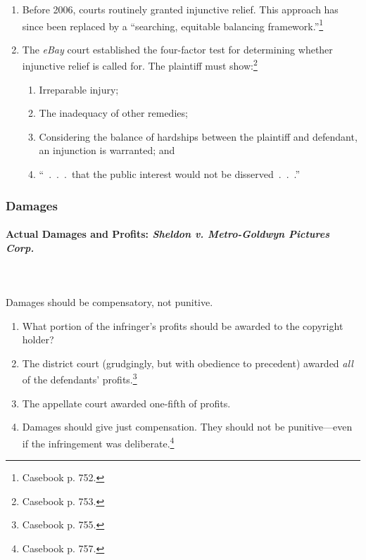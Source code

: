 \begin{enumerate}
    \item Before 2006, courts routinely granted injunctive relief. This 
    approach has since been replaced by a ``searching, equitable balancing 
    framework.''\footnote{Casebook p. 752.}
    \item The \emph{eBay} court established the four-factor test for 
    determining whether injunctive relief is called for. The plaintiff must 
    show:\footnote{Casebook p. 753.}
    \begin{enumerate}
        \item Irreparable injury;
        \item The inadequacy of other remedies;
        \item Considering the balance of hardships between the plaintiff and 
        defendant, an injunction is warranted; and
        \item ``~.~.~.~that the public interest would not be 
        disserved~.~.~.''
    \end{enumerate}
\end{enumerate}

\subsubsection{Damages}

\paragraph{Actual Damages and Profits: \emph{Sheldon v. Metro-Goldwyn Pictures 
Corp.}}
~\\\\
Damages should be compensatory, not punitive.

\begin{enumerate}
    \item What portion of the infringer's profits should be awarded to the 
    copyright holder?
    \item The district court (grudgingly, but with obedience to precedent) 
    awarded \emph{all} of the defendants' profits.\footnote{Casebook p. 755.}
    \item The appellate court awarded one-fifth of profits.
    \item Damages should give just compensation. They should not be 
    punitive---even if the infringement was deliberate.\footnote{Casebook p. 
    757.}
\end{enumerate}

